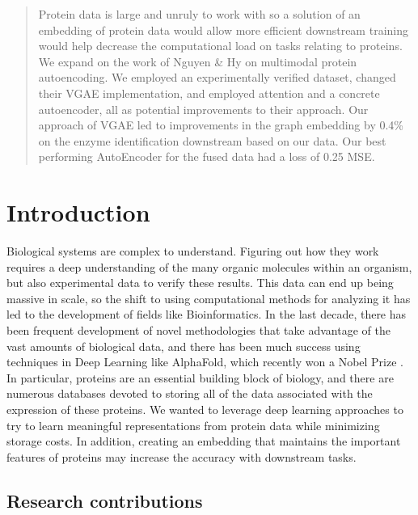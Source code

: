\documentclass{article}
\begin{document}
\printAffiliationsAndNotice{}  %

\begin{abstract} 
Protein data is large and unruly to work with so a solution of an embedding of protein data would allow more efficient downstream training would help decrease the computational load on tasks relating to proteins. We expand on the work of Nguyen \& Hy on multimodal protein autoencoding. We employed an experimentally verified dataset, changed their VGAE implementation, and employed attention and a concrete autoencoder, all as potential improvements to their approach. Our approach of VGAE led to improvements in the graph embedding by 0.4\% on the enzyme identification downstream based on our data. Our best performing AutoEncoder for the fused data had a loss of 0.25 MSE.
\end{abstract} 

\section{Introduction}

Biological systems are complex to understand. Figuring out how they work requires a deep understanding of the many organic molecules within an organism, but also experimental data to verify these results. This data can end up being massive in scale, so the shift to using computational methods for analyzing it has led to the development of fields like Bioinformatics. In the last decade, there has been frequent development of novel methodologies that take advantage of the vast amounts of biological data, and there has been much success using techniques in Deep Learning like AlphaFold, which recently won a Nobel Prize \cite{alphafold}. In particular, proteins are an essential building block of biology, and there are numerous databases devoted to storing all of the data associated with the expression of these proteins. We wanted to leverage deep learning approaches to try to learn meaningful representations from protein data while minimizing storage costs. In addition, creating an embedding that maintains the important features of proteins may increase the accuracy with downstream tasks.


\subsection{Research contributions}
\end{document}

